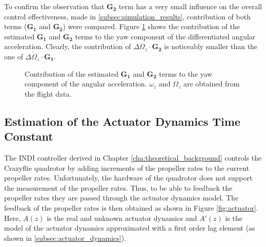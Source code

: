 \documentclass[11pt, a4paper, twoside]{report}
\begin{document}
To confirm the observation that $\bm{G_2}$ term has a very small influence on the overall control effectiveness, made in \ref{subsec:simulation_results}, contribution of both terms ($\bm{G_1}$ and $\bm{G_2}$) were compared. Figure \ref{fig:g2_comparison} shows the contribution of the estimated $\bm{G_1}$ and $\bm{G_2}$ terms to the yaw component of the differentiated angular acceleration. Clearly, the contribution of $\Delta\ddot{\Omega}_z \cdot \bm{G_2}$ is noticeably smaller than the one of $\Delta\dot{\Omega}_z \cdot \bm{G_1}$.

\begin{figure}[H]
	\centering 
	\captionsetup{justification=centering, singlelinecheck=off, font=bf, belowskip=-0.5cm}
	\caption[Contribution of control effectiveness terms to the angular acceleration]{Contribution of the estimated $\bm{G_1}$ and $\bm{G_2}$ terms to the yaw component of the angular acceleration. $\omega_z$ and $\Omega_z$ are obtained from the flight data.}
	\label{fig:g2_comparison}
\end{figure}

\subsection{Estimation of the Actuator Dynamics Time Constant} \label{subsec:time_const_estimation}

The \acrshort{INDI} controller derived in Chapter \ref{cha:theoretical_background} controls the Crazyflie quadrotor by adding increments of the propeller rates to the current propeller rates. Unfortunately, the hardware of the quadrotor does not support the measurement of the propeller rates. Thus, to be able to feedback the propeller rates they are passed through the actuator dynamics model. The feedback of the propeller rates is then obtained as shown in Figure \ref{fig:actuator}. Here, $A(z)$ is the real and unknown actuator dynamics and $A'(z)$ is the model of the actuator dynamics approximated with a first order lag element (as shown in \ref{subsec:actuator_dynamics}).
\end{document}
